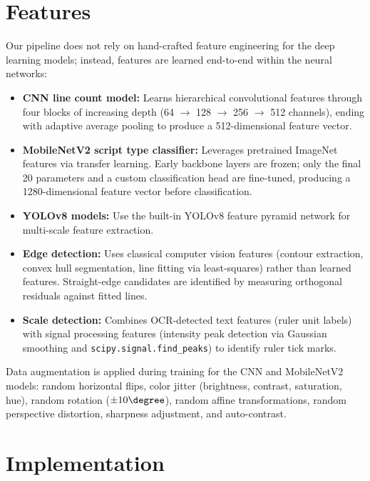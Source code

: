 \documentclass[11pt]{article}
\begin{document}
\section{Features}

Our pipeline does not rely on hand-crafted feature engineering for the deep learning models; instead, features are learned end-to-end within the neural networks:

\begin{itemize}
  \item \textbf{CNN line count model:} Learns hierarchical convolutional features through four blocks of increasing depth (64 $\to$ 128 $\to$ 256 $\to$ 512 channels), ending with adaptive average pooling to produce a 512-dimensional feature vector.
  \item \textbf{MobileNetV2 script type classifier:} Leverages pretrained ImageNet features via transfer learning.  Early backbone layers are frozen; only the final 20 parameters and a custom classification head are fine-tuned, producing a 1280-dimensional feature vector before classification.
  \item \textbf{YOLOv8 models:} Use the built-in YOLOv8 feature pyramid network for multi-scale feature extraction.
  \item \textbf{Edge detection:} Uses classical computer vision features (contour extraction, convex hull segmentation, line fitting via least-squares) rather than learned features. Straight-edge candidates are identified by measuring orthogonal residuals against fitted lines.
  \item \textbf{Scale detection:} Combines OCR-detected text features (ruler unit labels) with signal processing features (intensity peak detection via Gaussian smoothing and \texttt{scipy.signal.find\_peaks}) to identify ruler tick marks.
\end{itemize}

Data augmentation is applied during training for the CNN and MobileNetV2 models:
random horizontal flips, color jitter (brightness, contrast, saturation, hue), random rotation ($\pm 10\degree$), random affine transformations, random perspective distortion, sharpness adjustment, and auto-contrast.

\section{Implementation}
\end{document}
